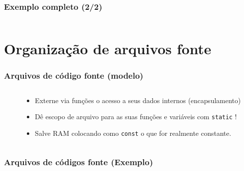\documentclass{beamer}
\begin{document}
\begin{frame}
	\frametitle{Exemplo completo (2/2)}
	\begin{columns}[T] %
		\begin{column}{.5\textwidth}
		
			\end{column}%
		\hfill%
		\begin{column}{.5\textwidth}
		
		\end{column}%
	\end{columns}
\end{frame}

\section{Organização de arquivos fonte}

\begin{frame}
	\frametitle{Arquivos de código fonte (modelo)}
	\begin{columns}[T] %
		\begin{column}{.60\textwidth}
			
		\end{column}%
		\hfill%
		\begin{column}{.40\textwidth}
			\begin{itemize}
				\item Externe via funções o acesso a seus dados internos (encapsulamento)
				\item Dê escopo de arquivo para as suas funções e variáveis com \texttt{static} !
				\item Salve RAM colocando como \texttt{const} o que for realmente constante.
			\end{itemize}
		\end{column}%
	\end{columns}
\end{frame}

\begin{frame}
	\frametitle{Arquivos de códigos fonte (Exemplo)}
	
\end{frame}
\end{document}
